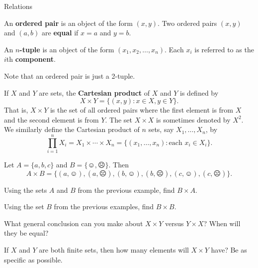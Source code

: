 \begin{section}{Relations}

\begin{definition}
An \textbf{ordered pair} is an object of the form $(x,y)$. Two ordered pairs $(x,y)$ and $(a,b)$ are \textbf{equal} if $x=a$ and $y=b$. 
\end{definition}

\begin{definition}
An \textbf{$n$-tuple} is an object of the form $(x_1, x_2,\ldots,x_n)$.  Each $x_i$ is referred to as the $i$th \textbf{component}.
\end{definition}

Note that an ordered pair is just a 2-tuple.

\begin{definition}
If $X$ and $Y$ are sets, the \textbf{Cartesian product} of $X$ and $Y$ is defined by
\[
X\times Y=\{(x,y): x\in X, y\in Y\}.
\]
That is, $X\times Y$ is the set of all ordered pairs where the first element is from $X$ and the second element is from $Y$.  The set $X\times X$ is sometimes denoted by $X^2$.  We similarly define the Cartesian product of $n$ sets, say $X_1, \ldots, X_n$, by
\[
\prod_{i=1}^{n} X_i=X_1\times \cdots \times X_n=\{(x_1,\ldots,x_n): \mbox{each } x_i\in X_i\}.
\]
\end{definition}

\begin{example}
Let $A=\{a,b,c\}$ and $B=\{\smiley,\frownie\}$.  Then 
\[
A\times B=\{(a,\smiley), (a,\frownie),(b,\smiley),(b,\frownie), (c,\smiley),(c,\frownie)\}.
\]
\end{example}

\begin{exercise}
Using the sets $A$ and $B$ from the previous example, find $B\times A$.  
\end{exercise}

\begin{exercise}
Using the set $B$ from the previous examples, find $B\times B$.  
\end{exercise}

\begin{exercise}
What general conclusion can you make about $X\times Y$ versus $Y\times X$?  When will they be equal?
\end{exercise}

\begin{exercise}
If $X$ and $Y$ are both finite sets, then how many elements will $X\times Y$ have?  Be as specific as possible.
\end{exercise}


\end{section}
